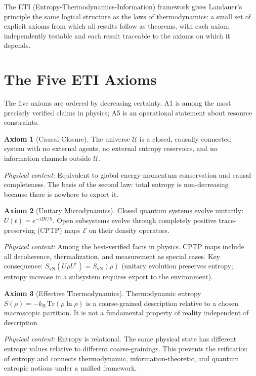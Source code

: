 \documentclass[12pt,letterpaper]{article}
\theoremstyle{plain}
\theoremstyle{definition}
\newtheorem{axiom}{Axiom}
\theoremstyle{remark}
\newcommand{\kB}{k_{\mathrm{B}}}
\newcommand{\SvN}{S_{\mathrm{vN}}}
\begin{document}
The ETI (Entropy-Thermodynamics-Information) framework gives Landauer's
principle the same logical structure as the laws of thermodynamics: a
small set of explicit axioms from which all results follow as theorems,
with each axiom independently testable and each result traceable to the
axioms on which it depends.

\section{The Five ETI Axioms}
\label{sec:axioms}

The five axioms are ordered by decreasing certainty. A1 is among the
most precisely verified claims in physics; A5 is an operational statement
about resource constraints.

\begin{axiom}[Causal Closure]
The universe $\mathcal{U}$ is a closed, causally connected system with
no external agents, no external entropy reservoirs, and no information
channels outside $\mathcal{U}$.
\end{axiom}
\textit{Physical content:} Equivalent to global energy-momentum conservation
and causal completeness. The basis of the second law: total entropy is
non-decreasing because there is nowhere to export it.

\begin{axiom}[Unitary Microdynamics]
Closed quantum systems evolve unitarily: $U(t) = e^{-iHt/\hbar}$.
Open subsystems evolve through completely positive trace-preserving (CPTP)
maps $\mathcal{E}$ on their density operators.
\end{axiom}
\textit{Physical content:} Among the best-verified facts in physics.
CPTP maps include all decoherence, thermalization, and measurement as
special cases. Key consequence: $\SvN(U\rho U^\dagger) = \SvN(\rho)$
(unitary evolution preserves entropy; entropy increase in a subsystem
requires export to the environment).

\begin{axiom}[Effective Thermodynamics]
Thermodynamic entropy $S(\rho) = -\kB\,\mathrm{Tr}(\rho\ln\rho)$ is a
coarse-grained description relative to a chosen macroscopic partition.
It is not a fundamental property of reality independent of description.
\end{axiom}
\textit{Physical content:} Entropy is relational. The same physical state
has different entropy values relative to different coarse-grainings.
This prevents the reification of entropy and connects thermodynamic,
information-theoretic, and quantum entropic notions under a unified framework.
\end{document}
